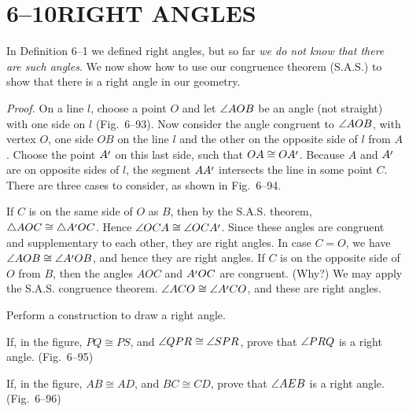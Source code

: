 \documentclass[11pt]{book}
\begin{document}
\section*{6--10\quad RIGHT ANGLES}

In Definition 6--1 we defined right angles, but so far \emph{we do not know
that there are such angles}. We now show how to use our congruence theorem
(S.A.S.) to show that there is a right angle in our geometry.

\FIGVININETYTHREE

\emph{Proof.} On a line $l$, choose a point $O$ and let $\angle AOB$ be an angle
(not straight) with one side on $l$ (Fig.~6--93). Now consider the angle
congruent to $\angle AOB$, with vertex $O$, one side $OB$ on the line $l$ and
the other on the opposite side of $l$ from $A$. Choose the point $A\VIpr$ on
this last side, such that $OA \cong OA\VIpr$. Because $A$ and $A\VIpr$ are on
opposite sides of $l$, the segment $AA\VIpr$ intersects the line in some point
$C$. There are three cases to consider, as shown in Fig.~6--94.

\FIGVININETYFOUR

If $C$ is on the same side of $O$ as $B$, then by the S.A.S. theorem,
$\tri{AOC} \cong \tri{A\VIpr OC}$. Hence $\ang{OCA} \cong \ang{OCA\VIpr}$.
Since these angles are congruent and supplementary to each other, they are
right angles. In case $C = O$, we have $\ang{AOB} \cong \ang{A\VIpr OB}$, and
hence they are right angles. If $C$ is on the opposite side of $O$ from $B$,
then the angles $AOC$ and $A\VIpr OC$ are congruent. (Why?) We may apply the
S.A.S. congruence theorem. $\ang{ACO} \cong \ang{A\VIpr CO}$, and these are
right angles.

\begin{exercisecols}
\begin{exlist}
\item Perform a construction to draw a right angle.
\item If, in the figure, $PQ \cong PS$, and $\angle QPR \cong \angle SPR$, prove
  that $\angle PRQ$ is a right angle. (Fig.~6--95)
\exfig{\FIGVININETYFIVE}
\item If, in the figure, $AB \cong AD$, and $BC \cong CD$, prove that
  $\angle AEB$ is a right angle. (Fig.~6--96)
\exfig{\FIGVININETYSIX}
\end{exlist}
\end{exercisecols}
\end{document}
